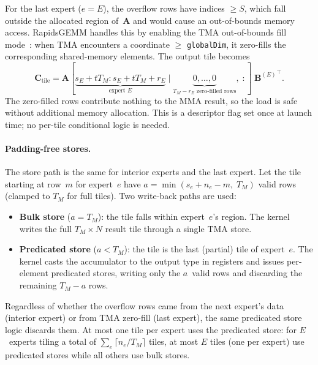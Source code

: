 \documentclass[11pt,a4paper]{article}
\theoremstyle{definition}
\begin{document}
For the last expert ($e = E$), the overflow rows have indices
$\geq S$, which fall outside the allocated region of~$\mathbf{A}$
and would cause an out-of-bounds memory access.
RapidsGEMM handles this by enabling the TMA out-of-bounds fill
mode~\cite{nvidia_cuda_programming_guide}: when TMA encounters a
coordinate $\geq$ \texttt{globalDim}, it zero-fills the corresponding
shared-memory elements. The output tile becomes
\begin{equation}
  \mathbf{C}_{\text{tile}} =
    \mathbf{A}[\underbrace{s_E{+}tT_M : s_E{+}tT_M{+}r_E}_{
      \text{expert } E}\;|\;
    \underbrace{0, \dots, 0}_{
      T_M{-}r_E \text{ zero-filled rows}},\; :]\;
    {\mathbf{B}^{(E)}}^{\!\top}.
\label{eq:tile-matmul-last}
\end{equation}
The zero-filled rows contribute nothing to the MMA result, so the load
is safe without additional memory allocation. This is a descriptor
flag set once at launch time; no per-tile conditional logic is needed.

\paragraph{Padding-free stores.}
The store path is the same for interior experts and the last expert.
Let the tile starting at row~$m$ for expert~$e$ have
$a = \min(s_e + n_e - m,\; T_M)$ valid rows (clamped to $T_M$ for
full tiles). Two write-back paths are used:
\begin{itemize}
  \item \textbf{Bulk store} ($a = T_M$): the tile falls
    within expert~$e$'s region. The kernel writes the full
    $T_M \times N$ result tile through a single TMA store.
  \item \textbf{Predicated store} ($a < T_M$): the tile is the last
    (partial) tile of expert~$e$. The kernel casts the accumulator to
    the output type in registers and issues per-element predicated
    stores, writing only the $a$~valid rows and discarding the
    remaining $T_M - a$ rows.
\end{itemize}
Regardless of whether the overflow rows came from the next
expert's data (interior expert) or from TMA zero-fill (last expert),
the same predicated store logic discards them. At most one tile per
expert uses the predicated store: for $E$~experts
tiling a total of $\sum_{e} \lceil n_e / T_M \rceil$ tiles, at most
$E$ tiles (one per expert) use predicated stores while all others use
bulk stores.

\end{document}
